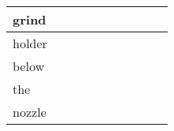 \documentclass[landscape]{article}
\newcommand{\ssp}{\hspace{2pt}}
\begin{document}
\begin{tabular}{|l|p{10pt}|p{10pt}|p{10pt}|p{10pt}|p{10pt}|p{10pt}|p{10pt}|p{10pt}|p{10pt}|}
\hline
\ssp grind \ssp&\hspace{2pt}&\hspace{2pt}&\hspace{2pt}&\hspace{2pt}&\hspace{2pt}&\hspace{2pt}&\hspace{2pt}&\hspace{2pt}&\hspace{2pt}\\
\hline
\ssp holder \ssp&\hspace{2pt}&\hspace{2pt}&\hspace{2pt}&\hspace{2pt}&\hspace{2pt}&\hspace{2pt}&\hspace{2pt}&\hspace{2pt}&\hspace{2pt}\\
\hline
\ssp below \ssp&\hspace{2pt}&\hspace{2pt}&\hspace{2pt}&\hspace{2pt}&\hspace{2pt}&\hspace{2pt}&\hspace{2pt}&\hspace{2pt}&\hspace{2pt}\\
\hline
\ssp the \ssp&\hspace{2pt}&\hspace{2pt}&\hspace{2pt}&\hspace{2pt}&\hspace{2pt}&\hspace{2pt}&\hspace{2pt}&\hspace{2pt}&\hspace{2pt}\\
\hline
\ssp nozzle \ssp&\hspace{2pt}&\hspace{2pt}&\hspace{2pt}&\hspace{2pt}&\hspace{2pt}&\hspace{2pt}&\hspace{2pt}&\hspace{2pt}&\hspace{2pt}\\

\end{tabular}
\end{document}
